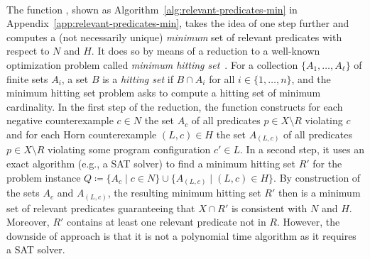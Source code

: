 \paragraph*{\protect{\RelevantPredicatesMin}}
The function \RelevantPredicatesMin, shown as Algorithm~\ref{alg:relevant-predicates-min} in Appendix~\ref{app:relevant-predicates-min}, takes the idea of \RelevantPredicatesFirst one step further and computes a (not necessarily unique) \emph{minimum} set of relevant predicates with respect to $N$ and $H$.
It does so by means of a reduction to a well-known optimization problem called \emph{minimum hitting set}~\cite{DBLP:conf/coco/Karp72}.
For a collection $\{ A_1, \ldots, A_\ell \}$ of finite sets $A_i$, a set $B$ is a \emph{hitting set} if $B \cap A_i$ for all $i \in \{ 1, \ldots, n \}$, and the minimum hitting set problem asks to compute a hitting set of minimum cardinality.
In the first step of the reduction, the function \RelevantPredicatesMin constructs for each negative counterexample $c \in N$ the set $A_c$ of all predicates $p \in X \setminus R$ violating $c$
and for each Horn counterexample $(L, c) \in H$ the set $A_{(L, c)}$ of all predicates $p \in X \setminus R$ violating some program configuration $c'\in L$.
In a second step, it uses an exact algorithm (e.g., a SAT solver) to find a minimum hitting set $R'$ for the problem instance $Q \coloneqq \{ A_c \mid c \in N \} \cup \{ A_{(L, c)} \mid (L, c) \in H \}$.
By construction of the sets $A_c$ and $A_{(L, c)}$, the resulting minimum hitting set $R'$ then is a minimum set of relevant predicates guaranteeing that $X \cap R'$ is consistent with $N$ and $H$.
Moreover, $R'$ contains at least one relevant predicate not in $R$.
However, the downside of approach is 
that it is not a polynomial time algorithm as it requires a SAT solver.


